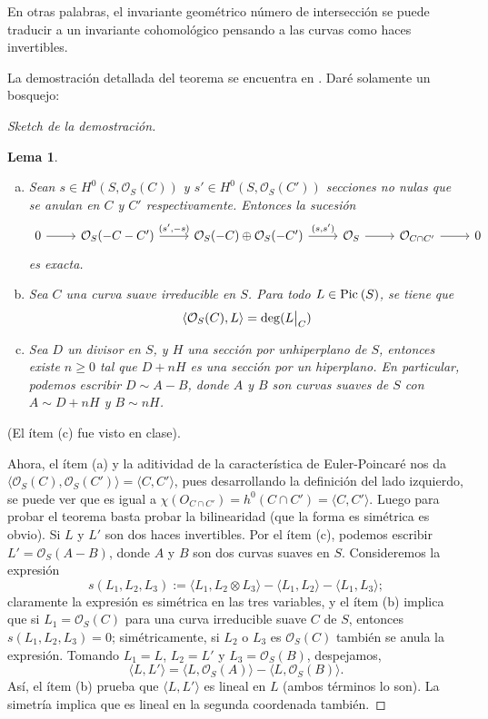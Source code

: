 \documentclass[spanish,12pt]{amsart}
\newcommand{\Pic}[1]{\textup{Pic}{ \: (#1)}}
\newtheorem{lemma}[theorem]{Lema}
\theoremstyle{definition}
\theoremstyle{remark}
\numberwithin{equation}{section}
\newcommand\rest[2]{{%
  \left.\kern-\nulldelimiterspace %
  #1 %
  \vphantom{\big|} %
  \right|_{#2} %
  }}
\renewcommand{\O}{\mathcal{O}}
\begin{document}
En otras palabras, el invariante geométrico número de intersección se puede traducir a un invariante cohomológico pensando a las curvas como haces invertibles.

La demostración detallada del teorema se encuentra en \cite{beauville1996complexAlgebraicSurfaces}. Daré solamente un bosquejo:
\begin{proof}[Sketch de la demostración]


\begin{lemma}
\begin{enumerate}[(a)]
\item Sean $s \in H^0 (S, \O_S (C))$ y $s' \in H^0 (S, \O_S(C'))$ secciones no nulas que se anulan en $C$ y $C'$ respectivamente. Entonces la sucesión
\[
    \begin{tikzcd}
    0 \ar{r} & \O_S (-C - C') \ar{r}{(s',-s)} & \O_S (-C) \oplus \O_S (-C') \ar{r}{(s, s')} & \O_S \ar{r} & \O_{C \cap C'} \ar{r} & 0
    \end{tikzcd}
\]
es exacta.
\item Sea $C$ una curva suave irreducible en $S$. Para todo $L \in \Pic S$, se tiene que
\[
    \langle \O_S (C), L \rangle = \deg (\rest L C)
\]
\item Sea $D$ un divisor en $S$, y $H$ una sección por unhiperplano de $S$, entonces existe $n \geq 0$ tal que $D + n H$ es una sección por un hiperplano. En particular, podemos escribir $D \sim A- B$, donde $A$ y $B$ son curvas suaves de $S$ con $A \sim D + n H$ y $B \sim n H$.
\end{enumerate}
\end{lemma}
(El ítem (c) fue visto en clase).

\bigskip

Ahora, el ítem (a) y la aditividad de la característica de Euler-Poincaré nos da $\langle \O_S (C), \O_S (C')\rangle = \langle  C, C'\rangle$, pues desarrollando la definición del lado izquierdo, se puede ver que es igual a $\chi (O_{C \cap C'}) = h^0 (C \cap C') = \langle C, C'\rangle$. Luego para probar el teorema basta probar la bilinearidad (que la forma es simétrica es obvio). Si $L$ y $L'$ son dos haces invertibles. Por el ítem (c), podemos escribir $L' = \O_S (A - B)$, donde $A$ y $B$ son dos curvas suaves en $S$. Consideremos la expresión
\[
    s(L_1, L_2,L_3) := \langle L_1, L_2 \otimes L_3 \rangle  - \langle L_1, L_2 \rangle  - \langle L_1, L_3 \rangle;
\]
claramente la expresión es simétrica en las tres variables, y el ítem (b) implica que si $L_1 = \O_S (C)$ para una curva irreducible suave $C$ de $S$, entonces $s(L_1,L_2, L_3) = 0$; simétricamente, si $L_2$ o $L_3$ es $\O_S (C)$ también se anula la expresión. Tomando $L_1 = L$, $L_2 = L'$ y $L_3 = \O_S (B)$, despejamos,
\[
    \langle L, L'\rangle  = \langle L, \O_S (A)\rangle - \langle L, \O_S (B)\rangle.
\]
Así, el ítem (b) prueba que $\langle L, L' \rangle $ es lineal en $L$ (ambos términos lo son). La simetría implica que es lineal en la segunda coordenada también.
\end{proof}
\end{document}
